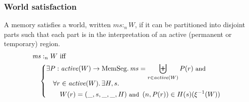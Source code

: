 \documentclass[compsoc,conference,letterpaper,fleqn]{IEEEtran}
\DeclareMathOperator{\dom}{dom}
\newcommand{\var}[1]{\mathit{#1}}
\newcommand{\hs}{\var{ms}}
\newcommand{\ms}{\hs}
\newcommand{\heap}{\var{mem}}
\newcommand{\plainfun}[2]{
  \ifthenelse{\equal{#2}{}}
  {\mathit{#1}}
  {\mathit{#1}(#2)}
}
\newcommand{\activeReg}[1]{\plainfun{active}{#1}}
\newcommand{\futurewk}{\mathbin{\sqsupseteq}^{\var{pub}}}
\newcommand{\futurestr}{\mathbin{\sqsupseteq}^{\var{priv}}}
\newcommand{\heapSat}[3][\heap]{#1 :_{#2} #3}
\newcommand{\memSat}[3][n]{\heapSat[#2]{#1}{#3}}
\newcommand{\plaindom}[1]{\mathrm{#1}}
\newcommand{\HeapSegments}{\plaindom{MemSeg}}
\newcommand{\npair}[2][n]{\left(#1,#2 \right)}
\begin{document}


\subsubsection{World satisfaction}
A memory satisfies a world, written $\memSat{\ms}{W}$, 
if it can be partitioned into disjoint parts such that each part is
in the interpretation of an active (permanent or temporary) region. 
\begin{align*}
  &\memSat{\ms}{W}
    \text{ iff }\\
  &\quad \left\{\begin{aligned}
        &\exists P : \activeReg{W} \rightarrow \HeapSegments \ldotp \hs = \biguplus_{r\in\activeReg{W}}P(r) \text{\footnotesize{ and }} \\[-.2cm]
        &\quad \forall r \in \activeReg{W} \ldotp \exists H,s \ldotp\\
        &\qquad W(r) = (\_,s,\_,\_,H) \text{\footnotesize{ and }} \npair[n]{P(r)} \in H(s)(\xi^{-1}(W))\\
      \end{aligned}\right.
\end{align*}
\end{document}
